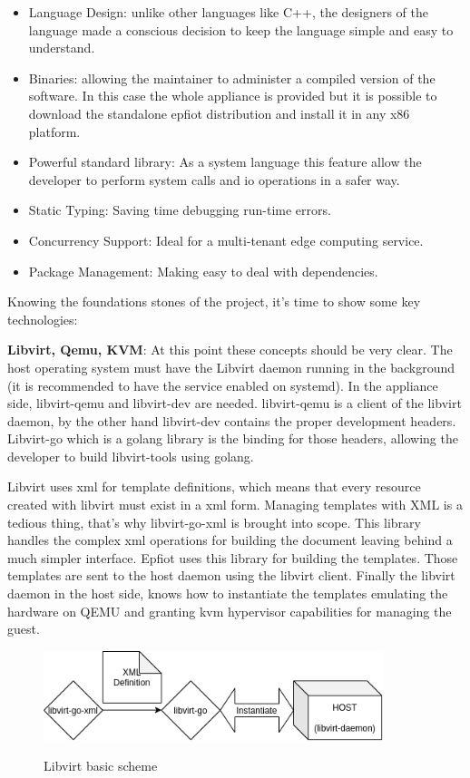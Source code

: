 \begin{itemize}
    \item Language Design: unlike other languages like C++, the designers of the language made a conscious decision to keep the language simple and easy to understand.
    \item Binaries: allowing the maintainer to administer a compiled version of the software. In this case the whole appliance is provided but it is possible to download the standalone epfiot distribution and install it in any x86 platform.
    \item Powerful standard library: As a system language this feature allow the developer to perform system calls and io operations in a safer way.
    \item Static Typing: Saving time debugging run-time errors.
    \item Concurrency Support: Ideal for a multi-tenant edge computing service.
    \item Package Management: Making easy to deal with dependencies.
\end{itemize}

Knowing the foundations stones of the project, it's time to show some key technologies:

\textbf{Libvirt, Qemu, KVM}: At this point these concepts should be very clear. The host operating system must have the Libvirt daemon running in the background (it is recommended to have the service enabled on systemd). In the appliance side, libvirt-qemu and libvirt-dev are needed. libvirt-qemu is a client of the libvirt daemon, by the other hand libvirt-dev contains the proper development headers. Libvirt-go which is a golang library is the binding for those headers, allowing the developer to build libvirt-tools using golang.

Libvirt uses xml for template definitions, which means that every resource created with libvirt must exist in a xml form. Managing templates with XML is a tedious thing, that's why libvirt-go-xml is brought into scope. This library handles the complex xml operations for building the document leaving behind a much simpler interface. Epfiot uses this library for building the templates. Those templates are sent to the host daemon using the libvirt client. Finally the libvirt daemon in the host side, knows how to instantiate the templates emulating the hardware on QEMU and granting kvm hypervisor capabilities for managing the guest.

\begin{figure}[h!]%
\centering
    \includegraphics[width=3.9in]{figures/libvirt-xml.png}
~\caption{Libvirt basic scheme}
\label{figure3.4}
\end{figure}

